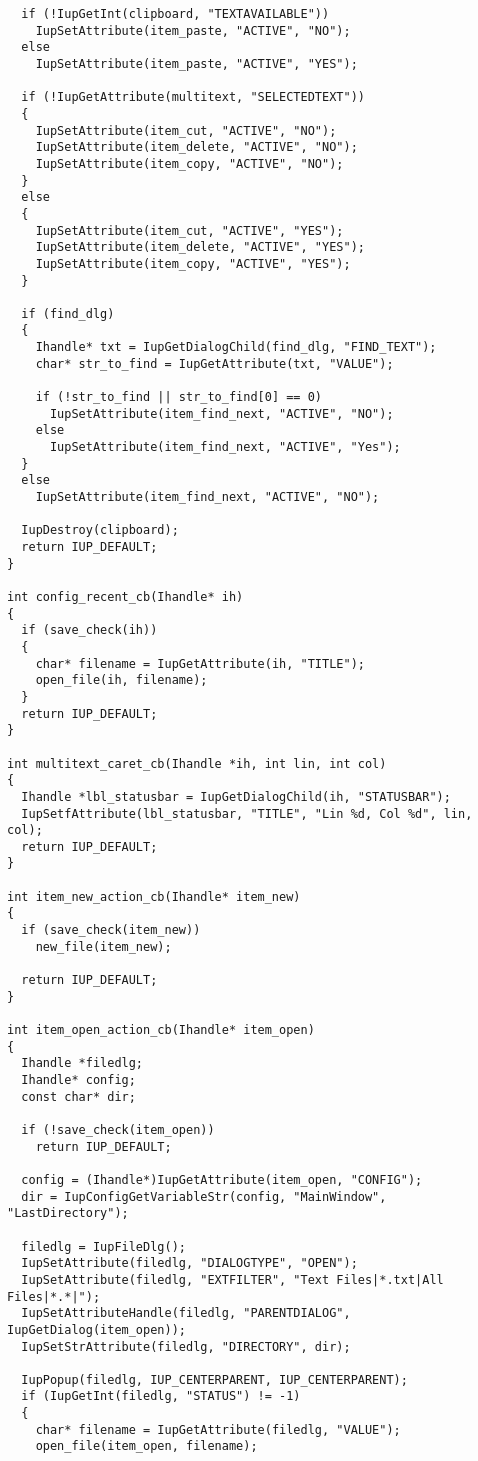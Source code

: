 \documentclass{ctexart}
\begin{document}
\begin{lstlisting}
  if (!IupGetInt(clipboard, "TEXTAVAILABLE"))
    IupSetAttribute(item_paste, "ACTIVE", "NO");
  else
    IupSetAttribute(item_paste, "ACTIVE", "YES");

  if (!IupGetAttribute(multitext, "SELECTEDTEXT")) 
  {
    IupSetAttribute(item_cut, "ACTIVE", "NO");
    IupSetAttribute(item_delete, "ACTIVE", "NO");
    IupSetAttribute(item_copy, "ACTIVE", "NO");
  }
  else 
  {
    IupSetAttribute(item_cut, "ACTIVE", "YES");
    IupSetAttribute(item_delete, "ACTIVE", "YES");
    IupSetAttribute(item_copy, "ACTIVE", "YES");
  }

  if (find_dlg)
  {
    Ihandle* txt = IupGetDialogChild(find_dlg, "FIND_TEXT");
    char* str_to_find = IupGetAttribute(txt, "VALUE");

    if (!str_to_find || str_to_find[0] == 0)
      IupSetAttribute(item_find_next, "ACTIVE", "NO");
    else
      IupSetAttribute(item_find_next, "ACTIVE", "Yes");
  }
  else
    IupSetAttribute(item_find_next, "ACTIVE", "NO");

  IupDestroy(clipboard);
  return IUP_DEFAULT;
}

int config_recent_cb(Ihandle* ih)
{
  if (save_check(ih))
  {
    char* filename = IupGetAttribute(ih, "TITLE");
    open_file(ih, filename);
  }
  return IUP_DEFAULT;
}

int multitext_caret_cb(Ihandle *ih, int lin, int col)
{
  Ihandle *lbl_statusbar = IupGetDialogChild(ih, "STATUSBAR");
  IupSetfAttribute(lbl_statusbar, "TITLE", "Lin %d, Col %d", lin, col);
  return IUP_DEFAULT;
}

int item_new_action_cb(Ihandle* item_new)
{
  if (save_check(item_new))
    new_file(item_new);

  return IUP_DEFAULT;
}

int item_open_action_cb(Ihandle* item_open)
{
  Ihandle *filedlg;
  Ihandle* config;
  const char* dir;

  if (!save_check(item_open))
    return IUP_DEFAULT;

  config = (Ihandle*)IupGetAttribute(item_open, "CONFIG");
  dir = IupConfigGetVariableStr(config, "MainWindow", "LastDirectory");

  filedlg = IupFileDlg();
  IupSetAttribute(filedlg, "DIALOGTYPE", "OPEN");
  IupSetAttribute(filedlg, "EXTFILTER", "Text Files|*.txt|All Files|*.*|");
  IupSetAttributeHandle(filedlg, "PARENTDIALOG", IupGetDialog(item_open));
  IupSetStrAttribute(filedlg, "DIRECTORY", dir);

  IupPopup(filedlg, IUP_CENTERPARENT, IUP_CENTERPARENT);
  if (IupGetInt(filedlg, "STATUS") != -1)
  {
    char* filename = IupGetAttribute(filedlg, "VALUE");
    open_file(item_open, filename);


\end{lstlisting}
\end{document}
